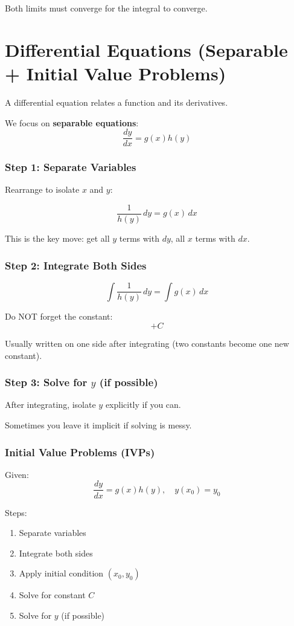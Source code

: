 \documentclass[11pt]{article}
\theoremstyle{mydef}
\begin{document}
Both limits must converge for the integral to converge.
\section*{Differential Equations (Separable + Initial Value Problems)}

A differential equation relates a function and its derivatives.

We focus on \textbf{separable equations}:
\[
\frac{dy}{dx} = g(x)h(y)
\]



\subsubsection*{Step 1: Separate Variables}

Rearrange to isolate $x$ and $y$:

\[
\frac{1}{h(y)}\,dy = g(x)\,dx
\]

This is the key move: get all $y$ terms with $dy$, all $x$ terms with $dx$.



\subsubsection*{Step 2: Integrate Both Sides}

\[
\int \frac{1}{h(y)}\,dy = \int g(x)\,dx
\]

Do NOT forget the constant:
\[
+ C
\]

Usually written on one side after integrating (two constants become one new constant).


\subsubsection*{Step 3: Solve for $y$ (if possible)}

After integrating, isolate $y$ explicitly if you can.

Sometimes you leave it implicit if solving is messy.



\subsubsection*{Initial Value Problems (IVPs)}

Given:
\[
\frac{dy}{dx} = g(x)h(y), \quad y(x_0)=y_0
\]

Steps:
\begin{enumerate}
\item Separate variables
\item Integrate both sides
\item Apply initial condition $(x_0, y_0)$
\item Solve for constant $C$
\item Solve for $y$ (if possible)
\end{enumerate}
\end{document}
